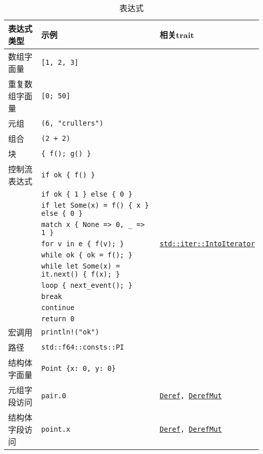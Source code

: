 \begin{longtable}{p{}p{}p{}}
    \caption{表达式}
    \label{t6-1} \\
    \hline
    \textbf{表达式类型} & \textbf{示例} & \textbf{相关trait} \\
    \hline
    数组字面量      & \texttt{[1, 2, 3]}         & \\
    重复数组字面量  & \texttt{[0; 50]}           & \\
    元组            & \texttt{(6, "crullers")}  & \\
    \cline{1-2}
    组合            & \texttt{(2 + 2)}             & \\
    块              & \texttt{\{ f(); g() \}}      & \\
    控制流表达式     & \texttt{if ok \{ f() \}}     & \\
                    & \texttt{if ok \{ 1 \} else \{ 0 \}}                   & \\
                    & \texttt{if let Some(x) = f() \{ x \} else \{ 0 \}}    & \\
                    & \texttt{match x \{ None => 0, \_ => 1 \}}             & \\
                    & \texttt{for v in e \{ f(v); \}}                       & \texttt{\hyperref[iter]{std::iter::IntoIterator}} \\
                    & \texttt{while ok \{ ok = f(); \}}                     & \\
                    & \texttt{while let Some(x) = it.next() \{ f(x); \}}    & \\
                    & \texttt{loop \{ next\_event(); \}}                    & \\
                    & \texttt{break}                  & \\
                    & \texttt{continue}               & \\
                    & \texttt{return 0}               & \\
    宏调用          & \texttt{println!("ok")}         & \\
    路径            & \texttt{std::f64::consts::PI}   & \\
    \cline{1-2}
    结构体字面量     & \texttt{Point \{x: 0, y: 0\}}     & \\
    \cline{1-2}
    元组字段访问    & \texttt{pair.0}   & \texttt{\hyperref[deref]{Deref}, \hyperref[deref]{DerefMut}} \\
    结构体字段访问  & \texttt{point.x}  & \texttt{\hyperref[deref]{Deref}, \hyperref[deref]{DerefMut}} \\

\end{longtable}
